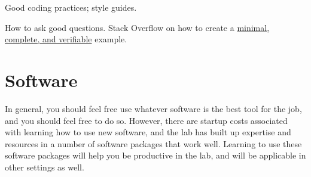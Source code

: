 \documentclass{tufte-book}
\begin{document}
Good coding practices; style guides.

How to ask good questions. Stack Overflow on how to create a
\href{https://stackoverflow.com/help/mcve}{minimal, complete, and
  verifiable} example.

\section{Software}

In general, you should feel free use whatever software is the best
tool for the job, and you should feel free to do so. However, there are
startup costs associated with learning how to use new software, and
the lab has built up expertise and resources in a number of software
packages that work well. Learning to use these software packages will
help you be productive in the lab, and will be applicable in other
settings as well.
\end{document}

